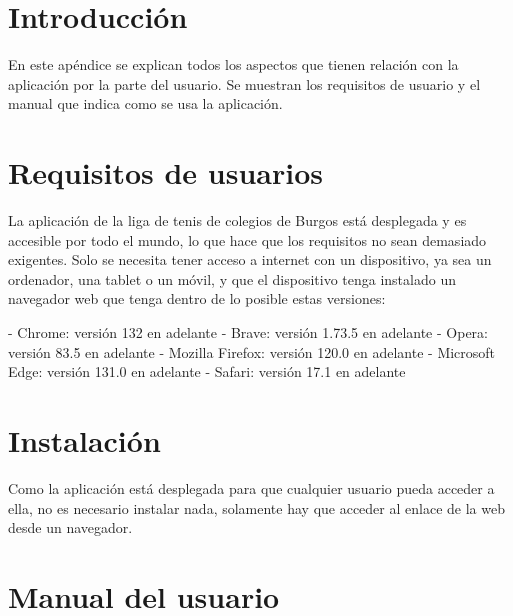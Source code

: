 
\section{Introducción}
En este apéndice se explican todos los aspectos que tienen relación con la aplicación por la parte del usuario. Se muestran los requisitos de usuario y el manual que indica como se usa la aplicación.

\section{Requisitos de usuarios}
La aplicación de la liga de tenis de colegios de Burgos está desplegada y es accesible por todo el mundo, lo que hace que los requisitos no sean demasiado exigentes. Solo se necesita tener acceso a internet con un dispositivo, ya sea un ordenador, una tablet o un móvil, y que el dispositivo tenga instalado un navegador web que tenga dentro de lo posible estas versiones:

- Chrome: versión 132 en adelante
- Brave: versión 1.73.5 en adelante
- Opera: versión 83.5 en adelante
- Mozilla Firefox: versión 120.0 en adelante
- Microsoft Edge: versión 131.0 en adelante
- Safari: versión 17.1 en adelante


\section{Instalación}
Como la aplicación está desplegada para que cualquier usuario pueda acceder a ella, no es necesario instalar nada, solamente hay que acceder al enlace de la web desde un navegador.


\section{Manual del usuario}


